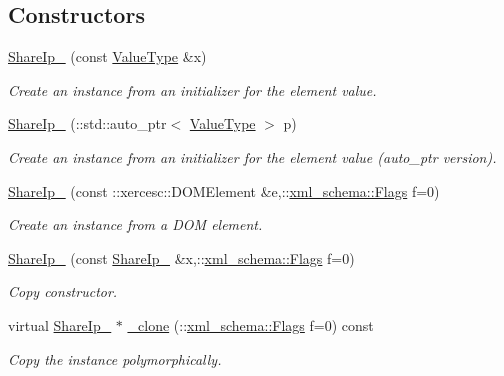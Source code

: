 \subsection*{Constructors}
\begin{DoxyCompactItemize}
\item 
\hyperlink{classopenstack_1_1xml_1_1ShareIp___a03057d09ea7f0100c94eff30948a8cb2}{ShareIp\_\-} (const \hyperlink{classopenstack_1_1xml_1_1ShareIp}{ValueType} \&x)
\begin{DoxyCompactList}\small\item\em Create an instance from an initializer for the element value. \item\end{DoxyCompactList}\item 
\hyperlink{classopenstack_1_1xml_1_1ShareIp___a4adaa802f172d807b5a1327e45e470df}{ShareIp\_\-} (::std::auto\_\-ptr$<$ \hyperlink{classopenstack_1_1xml_1_1ShareIp}{ValueType} $>$ p)
\begin{DoxyCompactList}\small\item\em Create an instance from an initializer for the element value (auto\_\-ptr version). \item\end{DoxyCompactList}\item 
\hyperlink{classopenstack_1_1xml_1_1ShareIp___aaeabbae95fbdb126730d196ae8a6d467}{ShareIp\_\-} (const ::xercesc::DOMElement \&e,::\hyperlink{namespacexml__schema_affb4c227cbd9aa7453dd1dc5a1401943}{xml\_\-schema::Flags} f=0)
\begin{DoxyCompactList}\small\item\em Create an instance from a DOM element. \item\end{DoxyCompactList}\item 
\hyperlink{classopenstack_1_1xml_1_1ShareIp___a31b4b308e130cd8ef196803114c719f2}{ShareIp\_\-} (const \hyperlink{classopenstack_1_1xml_1_1ShareIp__}{ShareIp\_\-} \&x,::\hyperlink{namespacexml__schema_affb4c227cbd9aa7453dd1dc5a1401943}{xml\_\-schema::Flags} f=0)
\begin{DoxyCompactList}\small\item\em Copy constructor. \item\end{DoxyCompactList}\item 
virtual \hyperlink{classopenstack_1_1xml_1_1ShareIp__}{ShareIp\_\-} $\ast$ \hyperlink{classopenstack_1_1xml_1_1ShareIp___ad1ac385fe1d2b7eba0437c8c1456457a}{\_\-clone} (::\hyperlink{namespacexml__schema_affb4c227cbd9aa7453dd1dc5a1401943}{xml\_\-schema::Flags} f=0) const 
\begin{DoxyCompactList}\small\item\em Copy the instance polymorphically. \item\end{DoxyCompactList}\end{DoxyCompactItemize}
